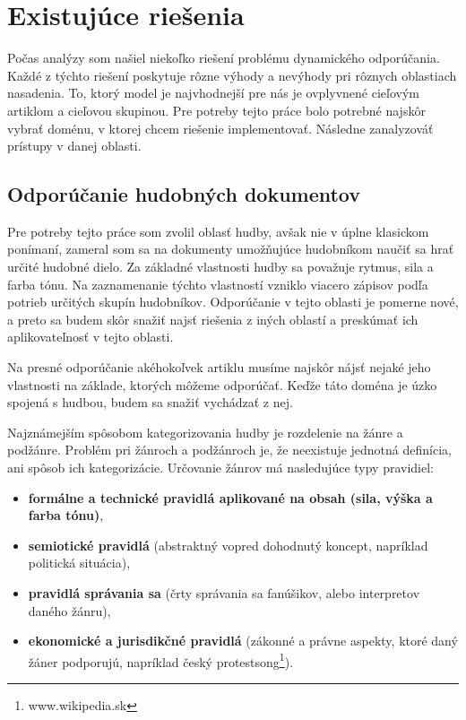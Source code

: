 \newpage

\section{Existujúce riešenia}

Počas analýzy som našiel niekoľko riešení problému dynamického odporúčania.
Každé z týchto riešení poskytuje rôzne výhody a nevýhody pri rôznych oblastiach
nasadenia. To, ktorý model je najvhodnejší pre nás je ovplyvnené cieľovým artiklom
a cieľovou skupinou. Pre potreby tejto práce bolo potrebné najskôr vybrať doménu,
v ktorej chcem riešenie implementovať. Následne zanalyzováť prístupy v danej oblasti.

\subsection{Odporúčanie hudobných dokumentov}

Pre potreby tejto práce som zvolil oblasť hudby, avšak nie v úplne klasickom ponímaní,
zameral som sa na dokumenty umožňujúce hudobníkom naučiť sa hrať určité hudobné dielo.
Za základné vlastnosti hudby sa považuje rytmus, sila a farba tónu.
Na zaznamenanie týchto vlastností vzniklo viacero zápisov podľa potrieb
určitých skupín hudobníkov. Odporúčanie v tejto oblasti je pomerne nové, 
a preto sa budem skôr snažiť najsť riešenia z iných oblastí a preskúmať
ich aplikovateľnosť v tejto oblasti.

Na presné odporúčanie akéhokoľvek artiklu musíme najskôr nájsť nejaké jeho
vlastnosti na základe, ktorých môžeme odporúčať. Keďže táto doména je úzko spojená s hudbou,
budem sa snažiť vychádzať z nej.

Najznámejším spôsobom kategorizovania hudby je rozdelenie na žánre a podžánre.
Problém pri žánroch a podžánroch je, že neexistuje jednotná definícia, ani spôsob
ich kategorizácie. Určovanie žánrov má nasledujúce typy pravidiel:

\begin{itemize}
\item{\textbf{formálne a technické pravidlá aplikované na obsah (sila, výška a farba tónu)},}
\item{\textbf{semiotické pravidlá} (abstraktný vopred dohodnutý koncept,
    napríklad politická situácia),}
\item{\textbf{pravidlá správania sa} 
    (črty správania sa fanúšikov, alebo interpretov daného žánru),}
\item{\textbf{ekonomické a jurisdikčné pravidlá} 
    (zákonné a právne aspekty, ktoré daný žáner podporujú,
        napríklad český protestsong\footnote[1]{www.wikipedia.sk}).}
\end{itemize}

